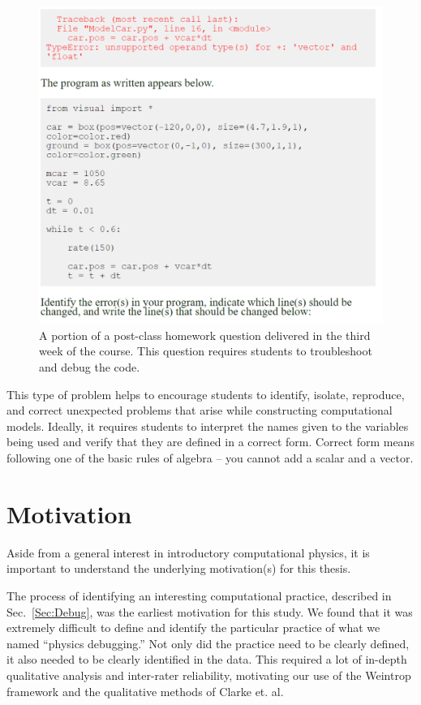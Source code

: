 \documentclass{msuphddissertation}
\begin{document}
\begin{doublespace}
\begin{figure}[ht]\centering
\includegraphics[scale=0.50]{images/CH3PostClassHomework.pdf}
\caption{A portion of a post-class homework question delivered in the third week of the course.  This question requires students to troubleshoot and debug the code.}\label{CH3:PostClassHomework}
\end{figure}

This type of problem helps to encourage students to identify, isolate, reproduce, and correct unexpected problems that arise while constructing computational models.  Ideally, it requires students to interpret the names given to the variables being used and verify that they are defined in a correct form.  Correct form means following one of the basic rules of algebra -- you cannot add a scalar and a vector.

%
%

\chapter{Motivation}\label{CH4:Motivation}

Aside from a general interest in introductory computational physics, it is important to understand the underlying motivation(s) for this thesis.

The process of identifying an interesting computational practice, described in Sec.~\ref{Sec:Debug}, was the earliest motivation for this study.  We found that it was extremely difficult to define and identify the particular practice of what we named ``physics debugging.''  Not only did the practice need to be clearly defined, it also needed to be clearly identified in the data.  This required a lot of in-depth qualitative analysis and inter-rater reliability, motivating our use of the Weintrop framework and the qualitative methods of Clarke et. al.


\end{doublespace}
\end{document}
